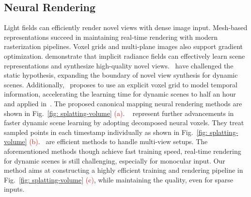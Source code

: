 \subsection{Neural Rendering}
\label{subsec:dynamic novel view synthesis}
Light fields can efficiently render novel views with dense image input. Mesh-based representations succeed in maintaining real-time rendering with modern rasterization pipelines. Voxel grids and multi-plane images also support gradient optimization. \cite{mildenhall2021nerf,barron2021mip,zhang2020nerf++} demonstrate that implicit radiance fields can effectively learn scene representations and synthesize high-quality novel views.~\cite{pumarola2021dnerf,park2021nerfies,park2021hypernerf} have challenged the static hypothesis, expanding the boundary of novel view synthesis for dynamic scenes. Additionally,~\cite{tineuvox} proposes to use an explicit voxel grid to model temporal information, accelerating the learning time for dynamic scenes to half an hour and applied in~\cite{gneuvox,robustdynamicradiancefields,guo2023forwardflowfornvs}. The proposed canonical mapping neural rendering methods are shown in Fig.~\ref{fig: splatting-volume} \textcolor{red} {(a)}. ~\cite{li2022neural,hexplane,kplanes,tensor4d,msth} represent further advancements in faster dynamic scene learning by adopting decomposed neural voxels. They treat sampled points in each timestamp individually as shown in Fig.~\ref{fig: splatting-volume} \textcolor{red} {(b)}.~\cite{wang2023neus2,gao2022mps,mlpmaps,xu2022multigeometric,lin2023im4d,wang2023mixedvoxels} are efficient methods to handle multi-view setups. The aforementioned methods though achieve fast training speed, real-time rendering for dynamic scenes is still challenging, especially for monocular input. Our method aims at constructing a highly efficient training and rendering pipeline in Fig.~\ref{fig: splatting-volume} \textcolor{red} {(c)}, while maintaining the quality, even for sparse inputs.

